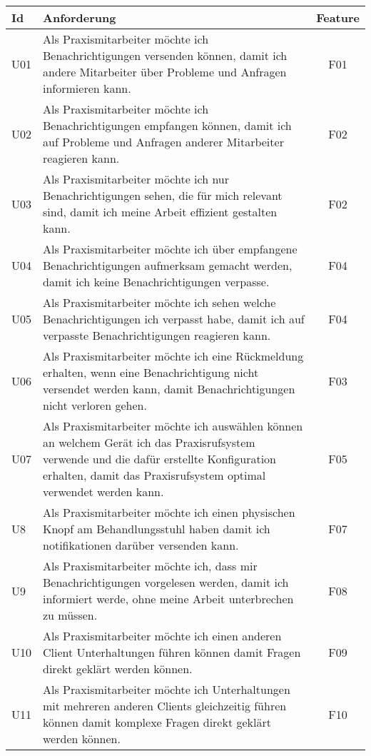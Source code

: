 \begin{table}[h]
    \centering
    \begin{tabular}{|l|p{13cm}|c|}
        \hline
        \textbf{Id} & \textbf{Anforderung}                                                                                                                                                                                         & \textbf{Feature} \\
        \hline
        U01         & Als Praxismitarbeiter möchte ich Benachrichtigungen versenden können, damit ich andere Mitarbeiter über Probleme und Anfragen informieren kann. & F01 \\
        \hline
        U02         & Als Praxismitarbeiter möchte ich Benachrichtigungen empfangen können, damit ich auf Probleme und Anfragen anderer Mitarbeiter reagieren kann. & F02 \\
        \hline
        U03         & Als Praxismitarbeiter möchte ich nur Benachrichtigungen sehen, die für mich relevant sind, damit ich meine Arbeit effizient gestalten kann. & F02 \\
        \hline
        U04         & Als Praxismitarbeiter möchte ich über empfangene Benachrichtigungen aufmerksam gemacht werden, damit ich keine Benachrichtigungen verpasse. & F04 \\
        \hline
        U05         & Als Praxismitarbeiter möchte ich sehen welche Benachrichtigungen ich verpasst habe, damit ich auf verpasste Benachrichtigungen reagieren kann. & F04 \\
        \hline
        U06         & Als Praxismitarbeiter möchte ich eine Rückmeldung erhalten, wenn eine Benachrichtigung nicht versendet werden kann, damit Benachrichtigungen nicht verloren gehen. & F03 \\
        \hline
        U07         & Als Praxismitarbeiter möchte ich auswählen können an welchem Gerät ich das Praxisrufsystem verwende und die dafür erstellte Konfiguration erhalten, damit das Praxisrufsystem optimal verwendet werden kann. & F05 \\
        \hline
        U8          & Als Praxismitarbeiter möchte ich einen physischen Knopf am Behandlungsstuhl haben damit ich notifikationen darüber versenden kann. & F07 \\
        \hline
        U9          & Als Praxismitarbeiter möchte ich, dass mir Benachrichtigungen vorgelesen werden, damit ich informiert werde, ohne meine Arbeit unterbrechen zu müssen. & F08 \\
        \hline
        U10         & Als Praxismitarbeiter möchte ich einen anderen Client Unterhaltungen führen können damit Fragen direkt geklärt werden können. & F09 \\
        \hline
        U11         & Als Praxismitarbeiter möchte ich Unterhaltungen mit mehreren anderen Clients gleichzeitig führen können damit komplexe Fragen direkt geklärt werden können. & F10 \\
        \hline
    \end{tabular}\label{tab:userstories1}
\end{table}

